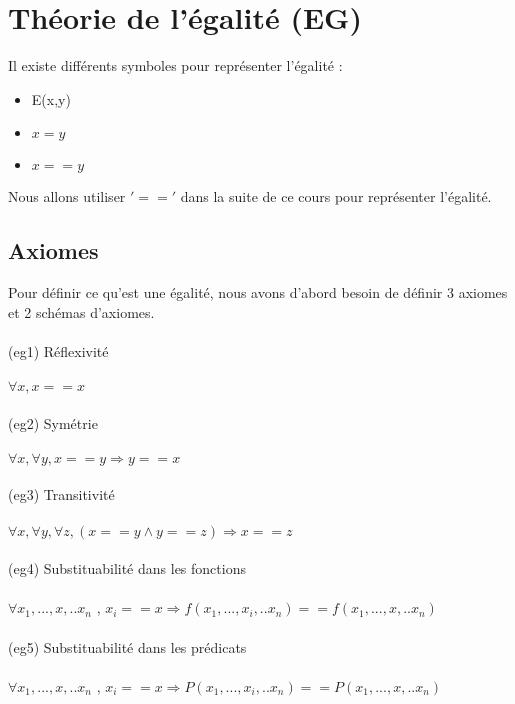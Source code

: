 \section{Théorie de l'égalité (EG)}
Il existe différents symboles pour représenter l'égalité : 
\begin{itemize}
	\item E(x,y)
	\item $x = y$
	\item $x == y $
\end{itemize}
Nous allons utiliser $'=='$ dans la suite de ce cours pour représenter l'égalité.

\subsection{Axiomes} 
Pour définir ce qu'est une égalité, nous avons d'abord besoin de définir 3 axiomes et 2 schémas d'axiomes.\\ \\
(eg1) Réflexivité \\ \\$\forall x, x==x$\\ \\
(eg2) Symétrie \\ \\$\forall x, \forall y, x==y \Rightarrow y==x$\\ \\
(eg3) Transitivité \\ \\$\forall x, \forall y, \forall z, (x==y \land y==z) \Rightarrow x==z$\\ \\
(eg4) Substituabilité dans les fonctions\\ \\$\forall x_{1}, ...,x, .. x_{n}$ ,  $x_{i}==x \Rightarrow f(x_{1}, ...,x_{i}, .. x_{n}) == f(x_{1}, ...,x, .. x_{n})$\\ \\
(eg5) Substituabilité dans les prédicats\\ \\$\forall x_{1}, ...,x, .. x_{n}$ ,  $x_{i}==x \Rightarrow P(x_{1}, ...,x_{i}, .. x_{n}) == P(x_{1}, ...,x, .. x_{n})$ \\ \\


